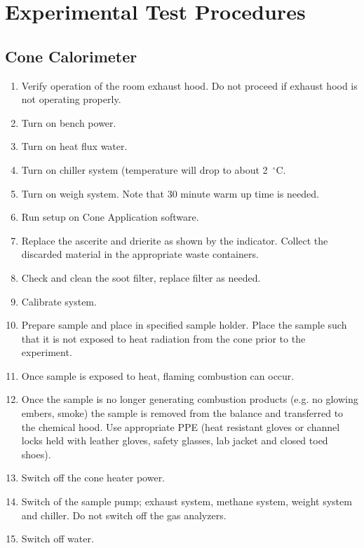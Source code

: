 \documentclass[12pt,oneside]{book}
\begin{document}
\section{Experimental Test Procedures}
\label{test_procedure}

\subsection{Cone Calorimeter}
\label{proc_cone}
\begin{enumerate}
  \item Verify operation of the room exhaust hood. Do not proceed if exhaust hood is not operating properly.
  \item Turn on bench power.
  \item Turn on heat flux water.
  \item Turn on chiller system (temperature will drop to about 2~$^{\circ}$C.
  \item Turn on weigh system. Note that 30 minute warm up time is needed.
  \item Run setup on Cone Application software.
  \item Replace the ascerite and drierite as shown by the indicator. Collect the discarded material in the appropriate waste containers.
  \item Check and clean the soot filter, replace filter as needed.
  \item Calibrate system.
  \item Prepare sample and place in specified sample holder. Place the sample such that it is not exposed to heat radiation from the cone prior to the experiment.
  \item Once sample is exposed to heat, flaming combustion can occur.
  \item Once the sample is no longer generating combustion products (e.g. no glowing embers, smoke) the sample is removed from the balance and transferred to the chemical hood. Use appropriate PPE (heat resistant gloves or channel locks held with leather gloves, safety glasses, lab jacket and closed toed shoes).
  \item Switch off the cone heater power. 
  \item Switch of the sample pump; exhaust system, methane system, weight system and chiller. Do not switch off the gas analyzers.
  \item Switch off water.
\end{enumerate}
\end{document}
